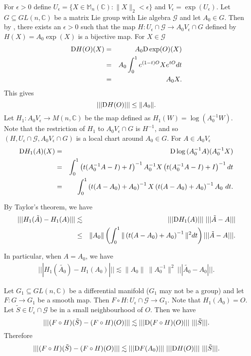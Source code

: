 \documentclass[12pt,epsfig,reqno]{amsart}
\newcommand{\De}{{\rm D}}
\theoremstyle{remark}
\begin{document}
For $\epsilon >0$
define $U_\epsilon=\{X\in \mathbb M_n(\mathbb C): \|X\|_2<\epsilon\}$ and $V_\epsilon= \exp(U_\epsilon)$.
Let $G\subseteq GL(n,\mathbb C)$ be a matrix Lie group with Lie algebra $\mathcal{G}$ and let $A_0\in G$. Then by \cite[Theorem 2.27]{hall}, there exists an $\epsilon>0$
such that the map $H: U_\epsilon \cap \mathcal{G}\to A_0V_\epsilon\cap G$ defined by  $H(X)= A_0 \exp(X)$ is a bijective map. For $X\in \mathcal{G}$
\begin{eqnarray*}\De H(O)(X)&=&A_0  \De\exp(O)(X)\\
&=& A_0\int_0^1 e^{(1-t)O}Xe^{tO}dt\\
&=&A_0 X.
\end{eqnarray*}
This gives
\begin{equation}\label{DpsiX}
|||\De H(O)|||\leq \|A_0\| .
\end{equation} Let $H_1: A_0V_\epsilon\to M(n, \mathbb C)$ be the map defined as $H_1(W)=\log (A_0^{-1}W).$ Note that the restriction of $H_1$ to $A_0V_\epsilon\cap G$ is $H^{-1}$, and so $(H, U_\epsilon\cap \mathcal{G}, A_0V_\epsilon \cap G)$ is a local chart around $A_0\in G$.  For $A\in A_0V_\epsilon$
\begin{eqnarray*}
\De H_1(A)(X)&=& \De \log{(A_0^{-1}A)}(A_0^{-1}X)\\
&=& \int_0^1\left(t(A_0^{-1}A-I)+I\right)^{-1}A_0^{-1}X\left(t(A_0^{-1}A-I)+I\right)^{-1} dt\\
&=& \int_0^1\left(t(A-A_0)+A_0\right)^{-1}X\left(t(A-A_0)+A_0\right)^{-1}A_0\ dt.
\end{eqnarray*}

By Taylor's theorem, we have
\begin{eqnarray*}
|||H_1(\tilde{A})-H_1(A)|||&\lesssim& |||\De H_1(A)|||\ |||\tilde{A}-A||| \\
&\leq&\|A_0\|\left(\int_0^1\|\left(t(A-A_0)+A_0\right)^{-1}\|^2dt\right)  |||\tilde{A}-A|||.
\end{eqnarray*}

In particular, when $A= A_0$,
we have
\begin{eqnarray}\label{derivatieofpsi_inverse}
|||H_1(\tilde{A_0})-H_1(A_0)|||\lesssim \|A_0\|\ \|A_0^{-1}\|^2 \ |||\tilde{A_0}-A_0|||.
\end{eqnarray}

Let $G_1\subseteq GL(n, \mathbb C) $ be a differential manifold ($G_1$ may not be a group) and let $F: G\to G_1$ be a smooth map.  Then
$F\circ H: U_\epsilon\cap \mathcal{G}\to G_1.$
Note that $ H_1(A_0)=O$. Let $\tilde{S}\in U_\epsilon\cap \mathcal{G}$  be in a small neighbourhood of $O$. Then we have
\begin{equation}
|||(F\circ H)(\tilde{S})-(F\circ H)(O)|||\lesssim|||\De(F\circ H)(O) |||\ |||\tilde{S}|||.
\end{equation}
Therefore
\begin{equation}
|||(F\circ H)(\tilde{S})-(F\circ H)(O)|||\lesssim|||\De F(A_0)|||\ |||\De H(O)|||\ |||\tilde{S}|||\label{Dphi}.
\end{equation}
\end{document}
